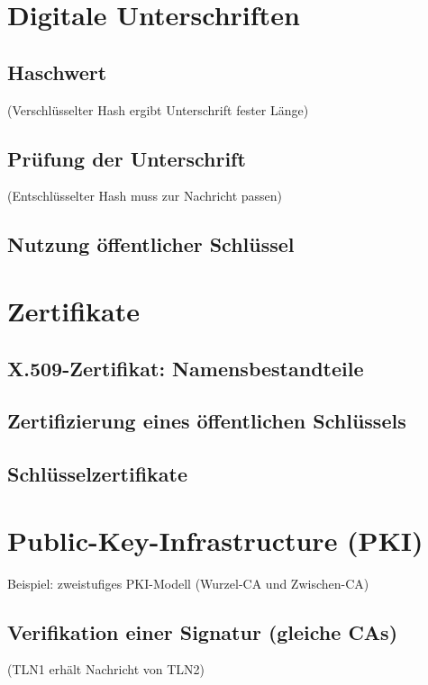 \section{Digitale Unterschriften}
\subsection{Haschwert}
(Verschlüsselter Hash ergibt Unterschrift fester Länge)
\subsection{Prüfung der Unterschrift}
(Entschlüsselter Hash muss zur Nachricht passen)
\subsection{Nutzung öffentlicher Schlüssel}

\section{Zertifikate}
\subsection{X.509-Zertifikat: Namensbestandteile}
\subsection{Zertifizierung eines öffentlichen Schlüssels}
\subsection{Schlüsselzertifikate}

\section{Public-Key-Infrastructure (PKI)}
Beispiel: zweistufiges PKI-Modell (Wurzel-CA und Zwischen-CA)
\subsection{Verifikation einer Signatur (gleiche CAs)}
(TLN1 erhält Nachricht von TLN2)
